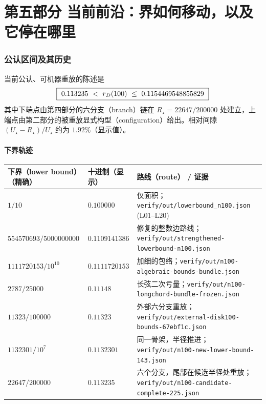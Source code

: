 \part*{第五部分 当前前沿：界如何移动，以及它停在哪里}
\setcounter{section}{0}

\section{公认区间及其历史}

当前公认、可机器重放的陈述是
\[
\boxed{\ 0.113235\ <\ \rD(100)\ \le\ 0.1154469548855829\ }
\]
其中下端点由第四部分的六分支（branch）链在 $R_\star=22647/200000$ 处建立，上端点由第二部分的被重放显式构型（configuration）给出。相对间隙 $(U_\star-R_\star)/U_\star$ 约为 $1.92\%$（显示值）。

\subsection{下界轨迹}

\begin{center}
\footnotesize
\begin{tabular}{@{}>{\raggedright\arraybackslash}p{}>{\raggedright\arraybackslash}p{}>{\raggedright\arraybackslash}p{}@{}}
\toprule
下界（lower bound）（精确） & 十进制（显示） & 路线（route） / 证据 \\
\midrule
$1/10$ & $0.100000$ & 仅面积；\texttt{verify/\allowbreak{}out/\allowbreak{}lowerbound\_\allowbreak{}n100.json} (L01--L20) \\
$554570693/5000000000$ & $0.1109141386$ & 修复的整数边路线；\texttt{verify/\allowbreak{}out/\allowbreak{}strengthened-\allowbreak{}lowerbound-\allowbreak{}n100.json} \\
$1111720153/10^{10}$ & $0.1111720153$ & 加细的包络；\texttt{verify/\allowbreak{}out/\allowbreak{}n100-\allowbreak{}algebraic-\allowbreak{}bounds-\allowbreak{}bundle.json} \\
$2787/25000$ & $0.11148$ & 长弦二次亏量；\texttt{verify/\allowbreak{}out/\allowbreak{}n100-\allowbreak{}longchord-\allowbreak{}bundle-\allowbreak{}frozen.json} \\
$11323/100000$ & $0.11323$ & 外部六分支重放；\texttt{verify/\allowbreak{}out/\allowbreak{}external-\allowbreak{}disk100-\allowbreak{}bounds-\allowbreak{}67ebf1c.json} \\
$1132301/10^{7}$ & $0.1132301$ & 同一骨架，半径推进；\texttt{verify/\allowbreak{}out/\allowbreak{}n100-\allowbreak{}new-\allowbreak{}lower-\allowbreak{}bound-\allowbreak{}143.json} \\
$22647/200000$ & $\mathbf{0.113235}$ & 六个分支，尾部在候选半径处重放；\texttt{verify/\allowbreak{}out/\allowbreak{}n100-\allowbreak{}candidate-\allowbreak{}complete-\allowbreak{}225.json} \\
\bottomrule
\end{tabular}
\end{center}

